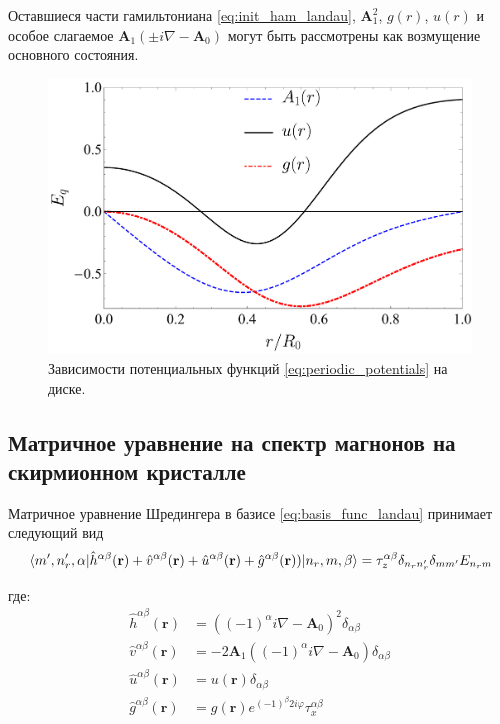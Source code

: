 \documentclass[a4paper,article,14pt]{extarticle}
\begin{document}
Оставшиеся части гамильтониана \eqref{eq:init_ham_landau}, $\mathbf{A}_1^2$, $g(r)$, $u(r)$ и особое слагаемое 
$\mathbf{A}_1  (\pm i \nabla - \mathbf{A}_0 )$ могут быть рассмотрены как возмущение основного состояния.


\begin{figure}[ht]
\centering	
\includegraphics[width=0.9\columnwidth]{images/potentials_h.pdf}
\caption{Зависимости потенциальных функций \eqref{eq:periodic_potentials} на диске.}
\label{fig:potentials_h}
\end{figure}


\subsection{Матричное уравнение на спектр магнонов на скирмионном кристалле}

Матричное уравнение Шредингера в базисе \eqref{eq:basis_func_landau} принимает следующий вид
\begin{equation}
\label{eq:shred_final}
\mel{m', n'_r, \alpha}{\hat h^{\alpha \beta}(\mathbf{r}) + \hat v^{\alpha \beta}(\mathbf{r}) + \hat u^{\alpha \beta}(\mathbf{r}) + \hat g^{\alpha \beta} (\mathbf{r})) }{n_r,m, \beta} = {\tau_z^{\alpha \beta} \delta_{n_r n'_r} \delta_{m m'} E_{n_r m} }
\end{equation}

\noindent где:
\begin{equation}
\label{eq:definitions}
\begin{aligned}
\hat h^{\alpha \beta}(\mathbf{r})   &= \left( (-1)^\alpha i \nabla - \mathbf{A}_0 \right) ^ 2 \delta_{\alpha \beta} \\
\hat v^{\alpha \beta}(\mathbf{r})   &= - 2 \mathbf{A}_1 \left( (-1)^{\alpha} i \nabla - \mathbf{A}_0 \right) \delta_{\alpha \beta} \\
\hat u^{\alpha \beta}(\mathbf{r})   &= u(\mathbf{r})  \delta_{\alpha \beta}\\
\hat g^{\alpha \beta} (\mathbf{r}) &=   g(\mathbf{r})  e^{ (-1)^{\beta} 2  i   \varphi} \tau^{\alpha \beta}_x 
\end{aligned}
\end{equation}
\end{document}
